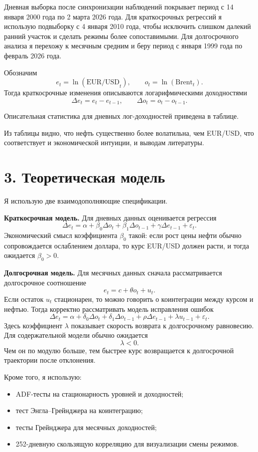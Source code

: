 \documentclass[a4paper,12pt]{article}
\begin{document}
Дневная выборка после синхронизации наблюдений покрывает период с 14 января 2000 года по 2 марта 2026 года. Для краткосрочных регрессий я использую подвыборку с 4 января 2010 года, чтобы исключить слишком далекий ранний участок и сделать режимы более сопоставимыми. Для долгосрочного анализа я перехожу к месячным средним и беру период с января 1999 года по февраль 2026 года.

Обозначим
\[
e_t=\ln(\text{EUR/USD}_t), \qquad o_t=\ln(\text{Brent}_t).
\]
Тогда краткосрочные изменения описываются логарифмическими доходностями
\[
\Delta e_t=e_t-e_{t-1}, \qquad \Delta o_t=o_t-o_{t-1}.
\]

Описательная статистика для дневных лог-доходностей приведена в таблице.

\begin{center}

\end{center}

Из таблицы видно, что нефть существенно более волатильна, чем EUR/USD, что соответствует и экономической интуиции, и выводам литературы.

\section*{3. Теоретическая модель}
Я использую две взаимодополняющие спецификации.

\textbf{Краткосрочная модель.}
Для дневных данных оценивается регрессия
\[
\Delta e_t=\alpha+\beta_0 \Delta o_t+\beta_1 \Delta o_{t-1}+\gamma \Delta e_{t-1}+\varepsilon_t.
\]
Экономический смысл коэффициента $\beta_0$ такой: если рост цены нефти обычно сопровождается ослаблением доллара, то курс EUR/USD должен расти, и тогда ожидается $\beta_0>0$.

\textbf{Долгосрочная модель.}
Для месячных данных сначала рассматривается долгосрочное соотношение
\[
e_t=c+\theta o_t+u_t.
\]
Если остаток $u_t$ стационарен, то можно говорить о коинтеграции между курсом и нефтью. Тогда корректно рассматривать модель исправления ошибок
\[
\Delta e_t=\alpha+\delta_0 \Delta o_t+\delta_1 \Delta o_{t-1}
+\rho \Delta e_{t-1}+\lambda u_{t-1}+\varepsilon_t.
\]
Здесь коэффициент $\lambda$ показывает скорость возврата к долгосрочному равновесию. Для содержательной модели обычно ожидается
\[
\lambda<0.
\]
Чем он по модулю больше, тем быстрее курс возвращается к долгосрочной траектории после отклонения.

Кроме того, я использую:
\begin{itemize}
    \item ADF-тесты на стационарность уровней и доходностей;
    \item тест Энгла--Грейнджера на коинтеграцию;
    \item тесты Грейнджера для месячных доходностей;
    \item 252-дневную скользящую корреляцию для визуализации смены режимов.
\end{itemize}
\end{document}

